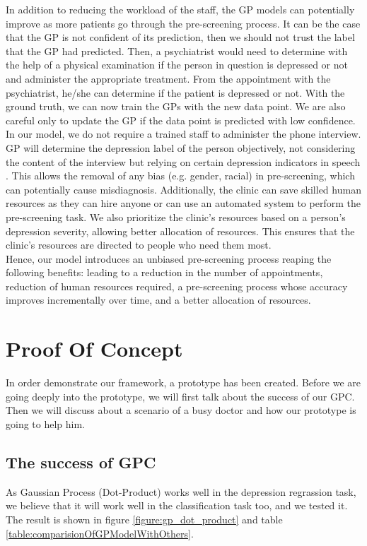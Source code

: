 \documentclass{article}
\begin{document}
    In addition to reducing the workload of the staff, the GP models can potentially improve as more patients go through the pre-screening process.
    It can be the case that the GP is not confident of its prediction, then we should not trust the label that the GP had predicted. 
    Then, a psychiatrist would need to determine with the help of a physical examination if the person in question is depressed or not and administer the appropriate treatment. 
    From the appointment with the psychiatrist, he/she can determine if the patient is depressed or not. 
    With the ground truth, we can now train the GPs with the new data point. 
    We are also careful only to update the GP if the data point is predicted with low confidence. \\

    In our model, we do not require a trained staff to administer the phone interview. 
    GP will determine the depression label of the person objectively, not considering the content of the interview but relying on certain depression indicators in speech \cite{nimh2015}. 
    This allows the removal of any bias (e.g. gender, racial) in pre-screening, which can potentially cause misdiagnosis. 
    Additionally, the clinic can save skilled human resources as they can hire anyone or can use an automated system to perform the pre-screening task.
    We also prioritize the clinic's resources based on a person's depression severity, allowing better allocation of resources. 
    This ensures that the clinic's resources are directed to people who need them most. \\

    Hence, our model introduces an unbiased pre-screening process reaping the following benefits: leading to a reduction in the number of appointments, reduction of human resources required, a pre-screening process whose accuracy improves incrementally over time, and a better allocation of resources.

	\section{Proof Of Concept}
	In order demonstrate our framework, a prototype has been created. Before we are going deeply into the prototype, 
	we will first talk about the success of our GPC. Then we will discuss about a scenario of a busy doctor and how our prototype is going to help him.
	
	\subsection{The success of GPC}
	As Gaussian Process (Dot-Product) works well in the depression regrassion task, we believe that it will work well in the classification task too, and we tested it. 
	The result is shown in figure \ref{figure:gp_dot_product} and table \ref{table:comparisionOfGPModelWithOthers}. \\
	
\end{document}
